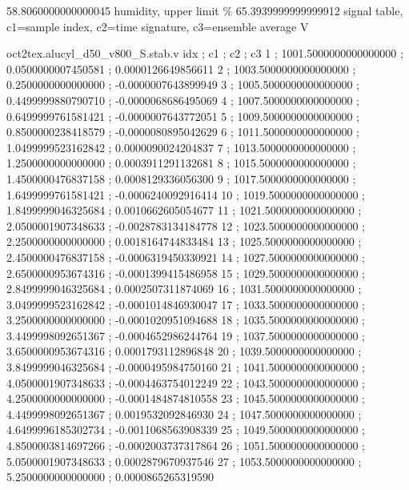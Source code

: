\expandafter\def\csname oct2tex.alucyl_d50_v800_S.hua.v\endcsname{58.8060000000000045}
\expandafter\def\csname oct2tex.alucyl_d50_v800_S.hub.d\endcsname{humidity, upper limit}
\expandafter\def\csname oct2tex.alucyl_d50_v800_S.hub.u\endcsname{\ensuremath{\%}}
\expandafter\def\csname oct2tex.alucyl_d50_v800_S.hub.v\endcsname{65.3939999999999912}
\expandafter\def\csname oct2tex.alucyl_d50_v800_S.stab.d\endcsname{signal table, c1=sample index, c2=time signature, c3=ensemble average}
\expandafter\def\csname oct2tex.alucyl_d50_v800_S.stab.u\endcsname{\ensuremath{\text{V}}}
\begin{filecontents}[overwrite]{oct2tex.alucyl_d50_v800_S.stab.v}
idx ; c1 ; c2 ; c3
1 ; 1001.5000000000000000 ; 0.0500000007450581 ; 0.0000126649856611
2 ; 1003.5000000000000000 ; 0.2500000000000000 ; -0.0000007643899949
3 ; 1005.5000000000000000 ; 0.4499999880790710 ; -0.0000068686495069
4 ; 1007.5000000000000000 ; 0.6499999761581421 ; -0.0000007643772051
5 ; 1009.5000000000000000 ; 0.8500000238418579 ; -0.0000080895042629
6 ; 1011.5000000000000000 ; 1.0499999523162842 ; 0.0000090024204837
7 ; 1013.5000000000000000 ; 1.2500000000000000 ; 0.0003911291132681
8 ; 1015.5000000000000000 ; 1.4500000476837158 ; 0.0008129336056300
9 ; 1017.5000000000000000 ; 1.6499999761581421 ; -0.0006240092916414
10 ; 1019.5000000000000000 ; 1.8499999046325684 ; 0.0010662605054677
11 ; 1021.5000000000000000 ; 2.0500001907348633 ; -0.0028783134184778
12 ; 1023.5000000000000000 ; 2.2500000000000000 ; 0.0018164744833484
13 ; 1025.5000000000000000 ; 2.4500000476837158 ; -0.0006319450330921
14 ; 1027.5000000000000000 ; 2.6500000953674316 ; -0.0001399415486958
15 ; 1029.5000000000000000 ; 2.8499999046325684 ; 0.0002507311874069
16 ; 1031.5000000000000000 ; 3.0499999523162842 ; -0.0001014846930047
17 ; 1033.5000000000000000 ; 3.2500000000000000 ; -0.0001020951094688
18 ; 1035.5000000000000000 ; 3.4499998092651367 ; -0.0004652986244764
19 ; 1037.5000000000000000 ; 3.6500000953674316 ; 0.0001793112896848
20 ; 1039.5000000000000000 ; 3.8499999046325684 ; -0.0000495984750160
21 ; 1041.5000000000000000 ; 4.0500001907348633 ; -0.0004463754012249
22 ; 1043.5000000000000000 ; 4.2500000000000000 ; -0.0001484874810558
23 ; 1045.5000000000000000 ; 4.4499998092651367 ; 0.0019532092846930
24 ; 1047.5000000000000000 ; 4.6499996185302734 ; -0.0011068563908339
25 ; 1049.5000000000000000 ; 4.8500003814697266 ; -0.0002003737317864
26 ; 1051.5000000000000000 ; 5.0500001907348633 ; 0.0002879670937546
27 ; 1053.5000000000000000 ; 5.2500000000000000 ; 0.0000865265319590

\end{filecontents}
